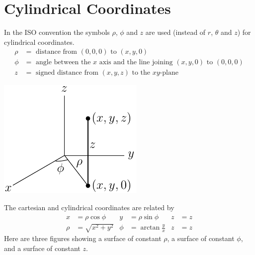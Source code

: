 \section{Cylindrical Coordinates}\label{ap:ISOcylCoord}
In the ISO convention the symbols $\rho$, $\phi$ and $z$ are used 
(instead of $r$, $\theta$ and $z$) for cylindrical coordinates.
\begin{align*}
\rho&=\text{ distance from }(0,0,0)\text{ to }(x,y,0)\\
\phi&=\text{ angle between the $x$ axis and the line joining $(x,y,0)$ to $(0,0,0)$}\\
z&=\text{ signed distance from }(x,y,z)
\text{ to the $xy$-plane}
\end{align*}
\begin{efig}
\begin{center}
    \includegraphics{cyl1.pdf}
\end{center}
\end{efig}
The cartesian and cylindrical coordinates
are related by
\begin{align*}
x&=\rho\cos\phi &
y&=\rho\sin\phi &
z&=z \\
    \rho&=\sqrt{x^2+y^2} &
    \phi&=\arctan\frac{y}{x} &
    z&=z
\end{align*}
Here are three figures showing a surface of constant $\rho$,
a surface of constant $\phi$, and a surface of constant $z$.
